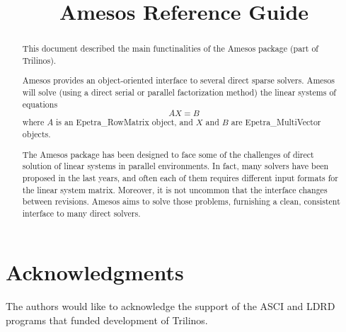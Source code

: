 \documentclass[11pt]{SANDreport}
\title{Amesos Reference Guide}
\begin{document}
\maketitle

\begin{abstract}
  
  This document described the main functinalities of the Amesos package
  (part of Trilinos).
  
  Amesos provides an object-oriented interface to several direct sparse
  solvers. Amesos will solve (using a direct serial or parallel
  factorization method) the linear systems of equations
  \begin{equation}
    \label{eq:linear_system}
    A X = B
  \end{equation}
  where $A$ is an Epetra\_RowMatrix object, and $X$ and $B$ are
  Epetra\_MultiVector objects.
  
  The Amesos package has been designed to face some of the challenges of
  direct solution of linear systems in parallel environments. In fact,
  many solvers have been proposed in the last years, and often each of
  them requires different input formats for the linear system matrix.
  Moreover, it is not uncommon that the interface changes between
  revisions. Amesos aims to solve those problems, furnishing a clean,
  consistent interface to many direct solvers.
  
\end{abstract}

\clearpage

\SANDmain

\tableofcontents

\clearpage

\section*{Acknowledgments}
The authors would like to acknowledge the support of the ASCI and LDRD programs
that funded development of Trilinos.

\smallskip


\smallskip


\smallskip

\end{document}
